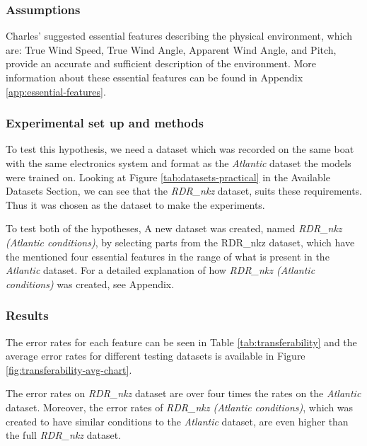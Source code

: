 \documentclass[12pt,twoside]{report}
\begin{document}
\subsubsection{Assumptions}
Charles' suggested essential features describing the physical environment, which are: True Wind Speed, True Wind Angle, Apparent Wind Angle, and Pitch, provide an accurate and sufficient description of the environment. More information about these essential features can be found in Appendix \ref{app:essential-features}.

\subsubsection{Experimental set up and methods}
To test this hypothesis, we need a dataset which was recorded on the same boat with the same electronics system and format as the \textit{Atlantic} dataset the models were trained on. Looking at Figure \ref{tab:datasets-practical} in the Available Datasets Section, we can see that the \textit{RDR\_nkz} dataset, suits these requirements. Thus it was chosen as the dataset to make the experiments.

To test both of the hypotheses, A new dataset was created, named \textit{RDR\_nkz (Atlantic conditions)}, by selecting parts from the RDR\_nkz dataset, which have the mentioned four essential features in the range of what is present in the \textit{Atlantic} dataset. For a detailed explanation of how \textit{RDR\_nkz (Atlantic conditions)} was created, see Appendix.


\subsubsection{Results}

The error rates for each feature can be seen in Table \ref{tab:transferability} and the average error rates for different testing datasets is available in Figure \ref{fig:transferability-avg-chart}.

The error rates on \textit{RDR\_nkz} dataset are over four times the rates on the \textit{Atlantic} dataset. Moreover, the error rates of \textit{RDR\_nkz (Atlantic conditions)}, which was created to have similar conditions to the \textit{Atlantic} dataset, are even higher than the full \textit{RDR\_nkz} dataset.
\end{document}
